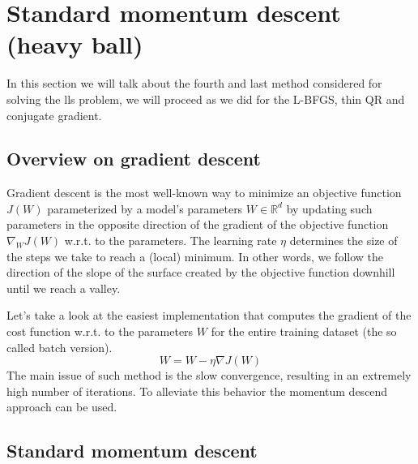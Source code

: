 \section{Standard momentum descent (heavy ball)} \label{sec:smd}
In this section we will talk about the fourth and last method considered for solving the lls problem, we will proceed as we did for the L-BFGS, thin QR and conjugate gradient.

\subsection{Overview on gradient descent}
Gradient descent is the most well-known way to minimize an objective function $J(W)$ parameterized by a model's parameters $W \in \mathbb{R}^d$ by updating such parameters in the opposite direction of the gradient of the objective function $\nabla_{W}J(W)$  w.r.t. to the parameters. The learning rate $\eta$ determines the size of the steps we take to reach a (local) minimum. In other words, we follow the direction of the slope of the surface created by the objective function downhill until we reach a valley.
\vspace{3mm}

\noindent Let's take a look at the easiest implementation that computes the gradient of the cost function w.r.t. to the parameters $W$ for the entire training dataset (the so called batch version).
\begin{equation}
    W = W - \eta \nabla J(W)
    \label{eq:smd_batch_gradient_descent}
\end{equation}
The main issue of such method is the slow convergence, resulting in an extremely high number of iterations. To alleviate this behavior the momentum descend approach can be used.

\subsection{Standard momentum descent}

